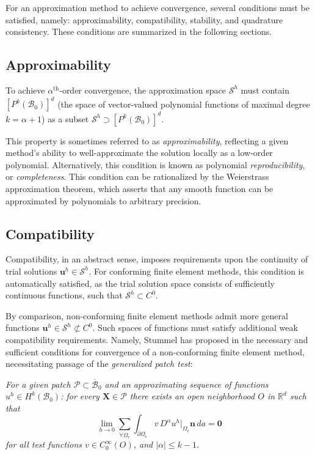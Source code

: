 For an approximation method to achieve convergence, several conditions must be satisfied, namely: approximability, compatibility, stability, and quadrature consistency. These conditions are summarized in the following sections.

	\subsection*{Approximability}
	
	To achieve $\alpha^{\text{th}}$-order convergence, the approximation space $\mathcal{S}^h$ must contain $[ P^{k} (\mathcal{B}_0) ]^d$ (the space of vector-valued polynomial functions of maximal degree $k = \alpha+1$) as a subset $\mathcal{S}^h \supset [ P^{k} (\mathcal{B}_0) ]^d$.
	
	This property is sometimes referred to as \textit{approximability}, reflecting a given method's ability to well-approximate the solution locally as a low-order polynomial. Alternatively, this condition is known as polynomial \textit{reproducibility}, or \textit{completeness}. This condition can be rationalized by the Weierstrass approximation theorem, which asserts that any smooth function can be approximated by polynomials to arbitrary precision.
	
	\subsection*{Compatibility}

	 Compatibility, in an abstract sense, imposes requirements upon the continuity of trial solutions $\mathbf{u}^h \in \mathcal{S}^h$. For conforming finite element methods, this condition is automatically satisfied, as the trial solution space consists of sufficiently continuous functions, such that $\mathcal{S}^h \subset C^0$.

By comparison, non-conforming finite element methods admit more general functions $\mathbf{u}^h \in \mathcal{S}^h \not\subset C^0$. Such spaces of functions must satisfy additional weak compatibility requirements. Namely, Stummel has proposed in \cite{Stummel:79} the necessary and sufficient conditions for convergence of a non-conforming finite element method, necessitating passage of the \textit{generalized patch test}:

\textit{For a given patch $\mathcal{P} \subset \overline{\mathcal{B}}_0$ and an approximating sequence of functions $u^h \in H^k (\mathcal{B}_0)$: for every $\mathbf{X} \in \mathcal{P}$ there exists an open neighborhood $O$ in $\mathbb{R}^d$ such that}
\begin{equation}
  \lim_{h \rightarrow 0} \sum_{\forall \Omega_e} \int_{\partial \Omega_e} v \, D^\alpha u^h|_{\Omega_e} \mathbf{n} \, da = \mathbf{0}
\end{equation}
\textit{for all test functions $v \in C^{\infty}_0 (O)$, and $| \alpha | \leq k-1$.}

